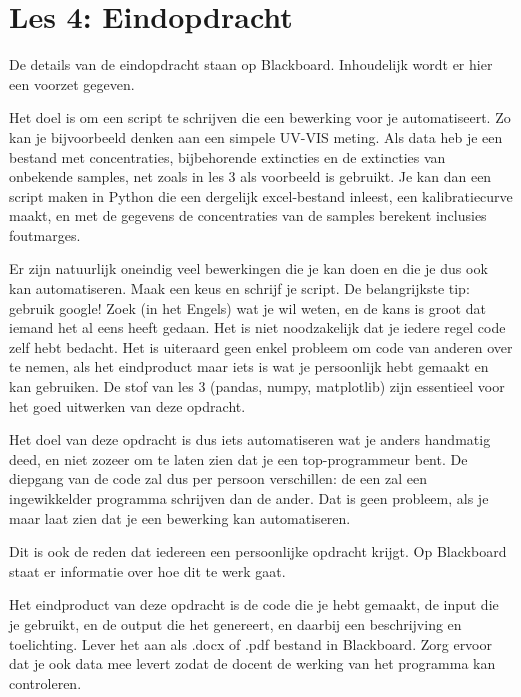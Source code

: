 \chapter{Les 4: Eindopdracht}

De details van de eindopdracht staan op Blackboard. Inhoudelijk wordt er hier een voorzet gegeven.

Het doel is om een script te schrijven die een bewerking voor je automatiseert. Zo kan je bijvoorbeeld denken aan een simpele UV-VIS meting. Als data heb je een bestand met concentraties, bijbehorende extincties en de extincties van onbekende samples, net zoals in les 3 als voorbeeld is gebruikt. Je kan dan een script maken in Python die een dergelijk excel-bestand inleest, een kalibratiecurve maakt, en met de gegevens de concentraties van de samples berekent inclusies foutmarges. 

Er zijn natuurlijk oneindig veel bewerkingen die je kan doen en die je dus ook kan automatiseren. Maak een keus en schrijf je script. De belangrijkste tip: gebruik google! Zoek (in het Engels) wat je wil weten, en de kans is groot dat iemand het al eens heeft gedaan. Het is niet noodzakelijk dat je iedere regel code zelf hebt bedacht. Het is uiteraard geen enkel probleem om code van anderen over te nemen, als het eindproduct maar iets is wat je persoonlijk hebt gemaakt en kan gebruiken. 
De stof van les 3 (pandas, numpy, matplotlib) zijn essentieel voor het goed uitwerken van deze opdracht.

Het doel van deze opdracht is dus iets automatiseren wat je anders handmatig deed, en niet zozeer om te laten zien dat je een top-programmeur bent. De diepgang van de code zal dus per persoon verschillen: de een zal een ingewikkelder programma schrijven dan de ander. Dat is geen probleem, als je maar laat zien dat je een bewerking kan automatiseren.

Dit is ook de reden dat iedereen een persoonlijke opdracht krijgt. Op Blackboard staat er informatie over hoe dit te werk gaat.

Het eindproduct van deze opdracht is de code die je hebt gemaakt, de input die je gebruikt, en de output die het genereert, en daarbij een  beschrijving en toelichting. Lever het aan als .docx of .pdf bestand in Blackboard. Zorg ervoor dat je ook data mee levert zodat de docent de werking van het programma kan controleren.  